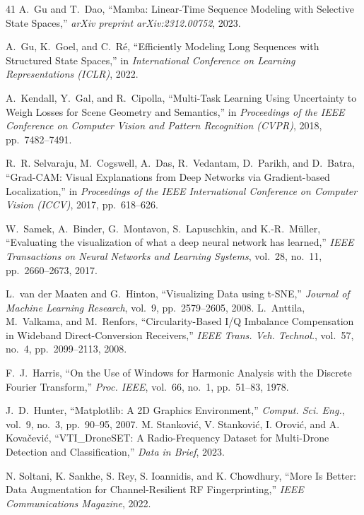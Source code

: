 \documentclass[runningheads]{llncs}
\begin{document}
\begin{thebibliography}{41}
A.~Gu and T.~Dao,
``Mamba: Linear-Time Sequence Modeling with Selective State Spaces,''
\emph{arXiv preprint arXiv:2312.00752}, 2023.

A.~Gu, K.~Goel, and C.~R\'{e},
``Efficiently Modeling Long Sequences with Structured State Spaces,''
in \emph{International Conference on Learning Representations (ICLR)}, 2022.

A.~Kendall, Y.~Gal, and R.~Cipolla,
``Multi-Task Learning Using Uncertainty to Weigh Losses for Scene Geometry and Semantics,''
in \emph{Proceedings of the IEEE Conference on Computer Vision and Pattern Recognition (CVPR)}, 2018, pp.~7482--7491.

R.~R. Selvaraju, M.~Cogswell, A.~Das, R.~Vedantam, D.~Parikh, and D.~Batra,
``Grad-CAM: Visual Explanations from Deep Networks via Gradient-based Localization,''
in \emph{Proceedings of the IEEE International Conference on Computer Vision (ICCV)}, 2017, pp.~618--626.

W.~Samek, A.~Binder, G.~Montavon, S.~Lapuschkin, and K.-R.~M\"{u}ller,
``Evaluating the visualization of what a deep neural network has learned,''
\emph{IEEE Transactions on Neural Networks and Learning Systems}, vol.~28, no.~11, pp.~2660--2673, 2017.

L.~van der Maaten and G.~Hinton,
``Visualizing Data using t-SNE,''
\emph{Journal of Machine Learning Research}, vol.~9, pp.~2579--2605, 2008.
L.~Anttila, M.~Valkama, and M.~Renfors,
``Circularity-Based I/Q Imbalance Compensation in Wideband Direct-Conversion Receivers,''
\emph{IEEE Trans. Veh. Technol.}, vol.~57, no.~4, pp.~2099--2113, 2008.

F.~J.~Harris,
``On the Use of Windows for Harmonic Analysis with the Discrete Fourier Transform,''
\emph{Proc. IEEE}, vol.~66, no.~1, pp.~51--83, 1978.

J.~D.~Hunter,
``Matplotlib: A 2D Graphics Environment,''
\emph{Comput. Sci. Eng.}, vol.~9, no.~3, pp.~90--95, 2007.
M. Stankovi\'{c}, V. Stankovi\'{c}, I. Orovi\'{c}, and A. Kova\v{c}evi\'{c},
``{VTI\_DroneSET}: A Radio-Frequency Dataset for Multi-Drone Detection and Classification,''
\emph{Data in Brief}, 2023.

N. Soltani, K. Sankhe, S. Rey, S. Ioannidis, and K. Chowdhury,
``More Is Better: Data Augmentation for Channel-Resilient {RF} Fingerprinting,''
\emph{IEEE Communications Magazine}, 2022.


\end{thebibliography}
\end{document}
